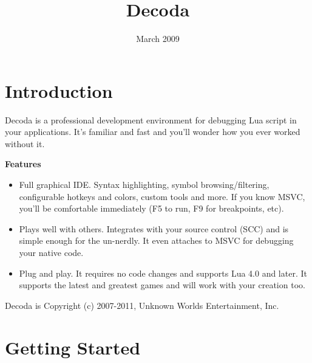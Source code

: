 %
\usepackage{url}
\date{March 2009}
\parskip=10pt%
\parindent=0pt%
\title{Decoda}%
\makeindex%
%
\maketitle%
\pagestyle{fancyplain}%
%
%
%
\setfooter{\thepage}{}{}{}{}{\thepage}%
\tableofcontents%

\chapter{Introduction}\label{intro}
%
%
\setfooter{\thepage}{}{}{}{}{\thepage}%

Decoda is a professional development environment for debugging Lua script in your applications. It's familiar and fast and you'll wonder how you ever worked without it.

\textbf{Features}
\begin{itemize}
\item Full graphical IDE. Syntax highlighting, symbol browsing/filtering, configurable hotkeys and colors, custom tools and more. If you know MSVC, you'll be comfortable immediately (F5 to run, F9 for breakpoints, etc).
\item Plays well with others. Integrates with your source control (SCC) and is simple enough for the un-nerdly. It even attaches to MSVC for debugging your native code.
\item Plug and play. It requires no code changes and supports Lua 4.0 and later. It supports the latest and greatest games and will work with your creation too.
\end{itemize}

Decoda is Copyright (c) 2007-2011, Unknown Worlds Entertainment, Inc.

\chapter{Getting Started}\label{getting_started}

